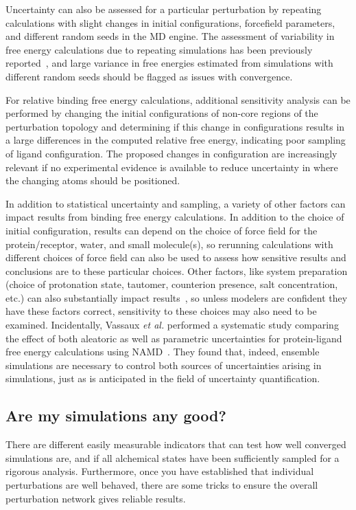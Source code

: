 Uncertainty can also be assessed for a particular perturbation by repeating calculations with slight changes in initial configurations, forcefield parameters, and different random seeds in the MD engine. 
The assessment of variability in free energy calculations due to repeating simulations has been previously reported~\cite{aldeghi2019accurate,paliwal2011benchmark,mey2016blinded,mey2018impact, bhati2017, bhati2018, bhati2022, bhati2025}, and large variance in free energies estimated from simulations with different random seeds should be flagged as issues with convergence. 

For relative binding free energy calculations, additional sensitivity analysis can be performed by changing the initial configurations of non-core regions of the perturbation topology and determining if this change in configurations results in a large differences in the computed relative free energy, indicating poor sampling of ligand configuration.
The proposed changes in configuration are increasingly relevant if no experimental evidence is available to reduce uncertainty in where the changing atoms should be positioned.

In addition to statistical uncertainty and sampling, a variety of other factors can impact results from binding free energy calculations. In addition to the choice of initial configuration, results can depend on the choice of force field for the protein/receptor, water, and small molecule(s), so rerunning calculations with different choices of force field can also be used to assess how sensitive results and conclusions are to these particular choices. Other factors, like system preparation (choice of protonation state, tautomer, counterion presence, salt concentration, etc.) can also substantially impact results~\cite{mobley2017predicting, mobley2017predictinga}, so unless modelers are confident they have these factors correct, sensitivity to these choices may also need to be examined.
Incidentally, Vassaux \textit{et al.} performed a systematic study comparing the effect of both aleatoric as well as parametric uncertainties for protein-ligand free energy calculations using NAMD~\cite{vassaux2021}. They found that, indeed, ensemble simulations are necessary to control both sources of uncertainties arising in simulations, just as is anticipated in the field of uncertainty quantification.

\subsection{Are my simulations any good?}
\label{sec:are-they-good}
There are different easily measurable indicators that can test how well converged simulations are, and if all alchemical states have been sufficiently sampled for a rigorous analysis. Furthermore, once you have established that individual perturbations are well behaved, there are some tricks to ensure the overall perturbation network gives reliable results.


